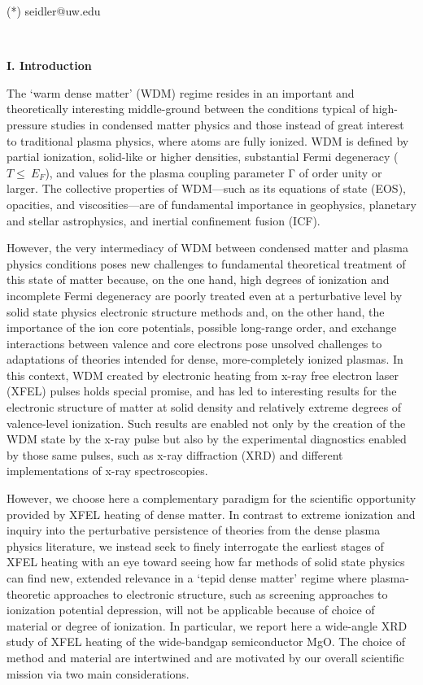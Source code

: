 (*) seidler@uw.edu

\textbf{\\}

\textbf{I. Introduction}

The `warm dense matter' (WDM) regime resides in an important and
theoretically interesting middle-ground between the conditions typical
of high-pressure studies in condensed matter physics and those instead
of great interest to traditional plasma physics, where atoms are fully
ionized. WDM is defined by partial ionization, solid-like or higher
densities, substantial Fermi degeneracy (\(T \leq \ E_{F}\)), and values
for the plasma coupling parameter Γ of order unity or larger. \cite{KOENIG2005PROGRESS}
The collective properties of WDM---such as its equations of state (EOS),
opacities, and viscosities---are of fundamental importance in
geophysics, planetary and stellar astrophysics, and inertial confinement
fusion (ICF). \cite{ATZENI2004PHYSICS}

However, the very intermediacy of WDM between condensed matter and
plasma physics conditions poses new challenges to fundamental
theoretical treatment of this state of matter because, on the one hand,
high degrees of ionization and incomplete Fermi degeneracy are poorly
treated even at a perturbative level by solid state physics electronic
structure methods and, on the other hand, the importance of the ion core
potentials, possible long-range order, and exchange interactions between
valence and core electrons pose unsolved challenges to adaptations of
theories intended for dense, more-completely ionized plasmas. In this
context, WDM created by electronic heating from x-ray free electron
laser (XFEL) pulses holds special promise, and has led to interesting
results for the electronic structure of matter at solid density and
relatively extreme degrees of valence-level ionization. \cite{RACKSTRAW2015SATURABLE, CIRICOSTA2016MEASUREMENTS} Such
results are enabled not only by the creation of the WDM state by the
x-ray pulse but also by the experimental diagnostics enabled by those
same pulses, such as x-ray diffraction (XRD) and different
implementations of x-ray spectroscopies. \cite{CHASE2016ULTRAFAST, YANO2009X, MCNEIL2010X, CHAPMAN2011FEMTOSECOND}

However, we choose here a complementary paradigm for the scientific
opportunity provided by XFEL heating of dense matter. In contrast to
extreme ionization and inquiry into the perturbative persistence of
theories from the dense plasma physics literature, we instead seek to
finely interrogate the earliest stages of XFEL heating with an eye
toward seeing how far methods of solid state physics can find new,
extended relevance in a `tepid dense matter' regime where
plasma-theoretic approaches to electronic structure, such as screening
approaches to ionization potential depression, will not be applicable
because of choice of material or degree of ionization. In particular, we
report here a wide-angle XRD study of XFEL heating of the wide-bandgap
semiconductor MgO. The choice of method and material are intertwined and
are motivated by our overall scientific mission via two main
considerations.

